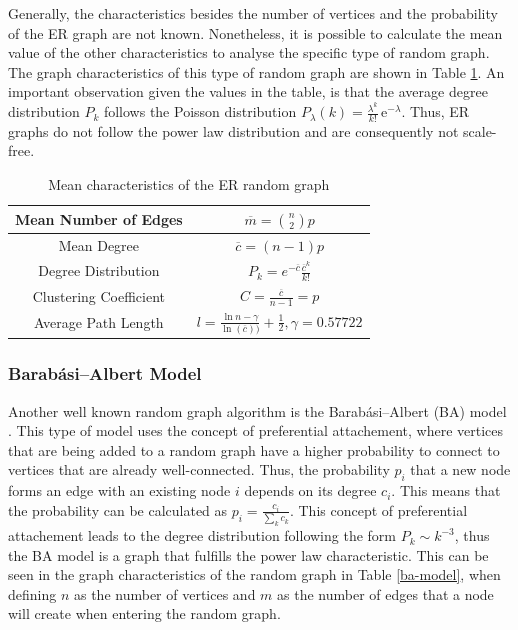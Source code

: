 Generally, the characteristics besides the number of vertices and the
probability of the ER graph are not known.
Nonetheless, it is possible to calculate the mean value of the other
characteristics to analyse the specific type of random graph.
The graph characteristics of this type of random graph are shown in Table 
\ref{erdos-model}.
An important observation given the values in the table, is that 
the average degree distribution $P_k$ follows the Poisson distribution
$P_\lambda (k) = \frac{\lambda^k}{k!}\, \mathrm{e}^{-\lambda}$. Thus,
ER graphs do not follow the power law distribution and are consequently
not scale-free. 

\begin{table}[ht!]
    \centering
    \begin{tabular}{|c | c |} 
     \hline
     Mean Number of Edges & 
     $\overline{m} = \binom{n}{2}p$  \\ 
     \hline
     Mean Degree & 
     $\overline{c} = (n-1)p$ \\ 
     \hline
     Degree Distribution & 
     $P_k = e^{-\overline{c}} \frac{\overline{c}^k}{k!}$ \\ 
     \hline
     Clustering Coefficient & 
     $C=\frac{\overline{c}}{n-1}=p$ \\ 
     \hline
     Average Path Length \cite{averagepath}& 
     $l = \frac{\ln{n} - \gamma}{\ln(\overline{c}))} + \frac{1}{2}, 
     \gamma=0.57722$ \\ 
     \hline
    \end{tabular}
    \caption{Mean characteristics of the ER random graph \cite{basicnetwork}}
    \label{erdos-model}
\end{table}

\subsubsection{Barabási–Albert Model}

Another well known random graph algorithm is the Barabási–Albert (BA) model 
\cite{barabasimodel}. 
This type of model uses the concept of preferential attachement, 
where vertices that are being added to a random graph have a higher 
probability to connect to vertices that are already well-connected. 
Thus, the probability $p_i$ that a new node forms an edge with an
existing node $i$ depends on its degree $c_i$. This means that the
probability can be calculated as $p_i= \frac{c_i}{\sum_{k}c_k}$.
This concept of preferential attachement leads to the degree distribution
following the form $P_k\sim k^{-3}$, thus the BA model is a graph 
that fulfills the power law characteristic.
This can be seen in the graph characteristics of the random graph
in Table \ref{ba-model}, when defining $n$ as the number
of vertices and $m$ as the number of edges that a node
will create when entering the random graph.


